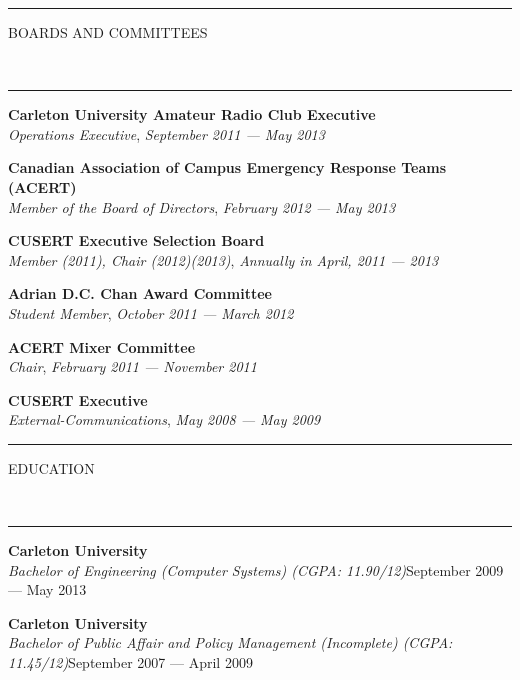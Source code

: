 \documentclass[10pt, letterpaper, oneside]{article}
\newcommand{\HRule}[2]{\textcolor{#1}{\rule{\linewidth}{#2}}}
\newcommand{\sectiontitle}[1]{\begin{minipage}{\textwidth}\HRule{black}{0.25mm}\vspace{-10pt}\begin{center}\Large\MakeUppercase{#1}\end{center}\end{minipage}\\\HRule{light-grey}{0.15mm}\vspace{\baselineskip}}
\newenvironment{tightressection}[1]{
  \begin{minipage}{\textwidth}
  \sectiontitle{#1}}
  {\vspace{\baselineskip}\end{minipage}}
\newcommand{\boardentry}[3]{
  \begin{minipage}{\textwidth}
  \vspace{-9pt}
  \textbf{#1}\\
  \textit{#2}, \textit{#3}\\
  \vspace{0.5\baselineskip}
  \end{minipage}
}
\newcommand{\resedentry}[3]{
  \begin{minipage}{\textwidth}
  \vspace{-10pt}
  \textbf{#1}\\
  \textit{#2}\hfill\textcolor{light-grey}{#3}\\
  \vspace{0.5\baselineskip}
  \end{minipage}
}
\begin{document}
\begin{tightressection}{Boards and Committees}
  \boardentry{Carleton University Amateur Radio Club Executive}{Operations Executive}{September 2011 --- May 2013}
  \boardentry{Canadian Association of Campus Emergency Response Teams (ACERT)}{Member of the Board of Directors}{February 2012 --- May 2013}
  \boardentry{CUSERT Executive Selection Board}{Member (2011), Chair (2012)(2013)}{Annually in April, 2011 --- 2013}
  \boardentry{Adrian D.C. Chan Award Committee}{Student Member}{October 2011 --- March 2012}
  \boardentry{ACERT Mixer Committee}{Chair}{February 2011 --- November 2011}
  \boardentry{CUSERT Executive}{External-Communications}{May 2008 --- May 2009}
\end{tightressection}
 
\vspace{-15pt}
\begin{tightressection}{education}
  \resedentry{Carleton University}{Bachelor of Engineering (Computer Systems) (CGPA: 11.90/12)}{September 2009 --- May 2013}
  \resedentry{Carleton University}{Bachelor of Public Affair and Policy Management (Incomplete) (CGPA: 11.45/12)}{September 2007 --- April 2009}
\end{tightressection}
 
\end{document}
